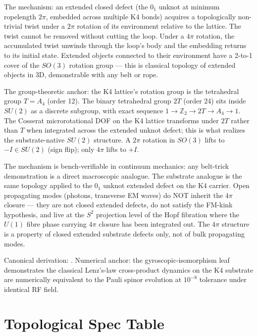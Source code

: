 The mechanism: an extended closed defect (the $0_1$ unknot at minimum ropelength $2\pi$, embedded across multiple K4 bonds) acquires a topologically non-trivial twist under a $2\pi$ rotation of its environment relative to the lattice. The twist cannot be removed without cutting the loop. Under a $4\pi$ rotation, the accumulated twist unwinds through the loop's body and the embedding returns to its initial state. Extended objects connected to their environment have a 2-to-1 cover of the $SO(3)$ rotation group --- this is classical topology of extended objects in 3D, demonstrable with any belt or rope.

The group-theoretic anchor: the K4 lattice's rotation group is the tetrahedral group $T = A_4$ (order 12). The binary tetrahedral group $2T$ (order 24) sits inside $SU(2)$ as a discrete subgroup, with exact sequence $1 \to \mathbb{Z}_2 \to 2T \to A_4 \to 1$. The Cosserat microrotational DOF on the K4 lattice transforms under $2T$ rather than $T$ when integrated across the extended unknot defect; this is what realizes the substrate-native $SU(2)$ structure. A $2\pi$ rotation in $SO(3)$ lifts to $-I \in SU(2)$ (sign flip); only $4\pi$ lifts to $+I$.

The mechanism is bench-verifiable in continuum mechanics: any belt-trick demonstration is a direct macroscopic analogue. The substrate analogue is the same topology applied to the $0_1$ unknot extended defect on the K4 carrier. Open propagating modes (photons, transverse EM waves) do NOT inherit the $4\pi$ closure --- they are not closed extended defects, do not satisfy the FM-kink hypothesis, and live at the $S^2$ projection level of the Hopf fibration where the $U(1)$ fibre phase carrying $4\pi$ closure has been integrated out. The $4\pi$ structure is a property of closed extended substrate defects only, not of bulk propagating modes.

Canonical derivation: . Numerical anchor: the gyroscopic-isomorphism leaf demonstrates the classical Lenz's-law cross-product dynamics on the K4 substrate are numerically equivalent to the Pauli spinor evolution at $10^{-8}$ tolerance under identical RF field.

\section{Topological Spec Table}
\label{sec:vol9_topological_spec_table}

